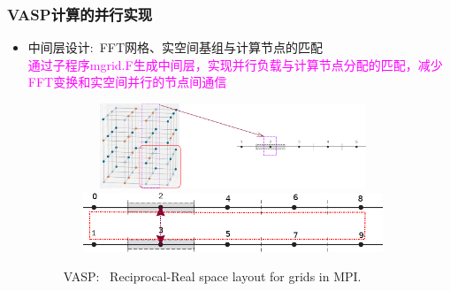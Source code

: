 \documentclass[cjk,slidestop,handout,compress,mathserif,blue]{beamer}	%
\begin{document}
\frame
{
	\frametitle{\textrm{VASP}计算的并行实现}
	\begin{itemize}
	     \item 中间层设计:~\textrm{FFT}网格、实空间基组与计算节点的匹配\\
		     \textcolor{magenta}{通过子程序\textrm{mgrid.F}生成中间层，实现并行负载与计算节点分配的匹配，减少\textrm{FFT}变换和实空间并行的节点间通信}
\begin{figure}[h!]
	\vspace{-0.25in}
\centering
\includegraphics[height=1.0in,width=4.0in,viewport=0 0 1500 450,clip]{Figures/VASP_FFT-MPI_Reciprocal.png}
\vskip 0.5pt
\includegraphics[height=0.7in,width=4.0in,viewport=0 0 730 150,clip]{Figures/VASP_FFT-MPI_Real.png}
\caption{\tiny \textrm{VASP:~ Reciprocal-Real space layout for grids in MPI.}}%
\label{MPI-FFT}
\end{figure} 
	\end{itemize}
}
\end{document}
